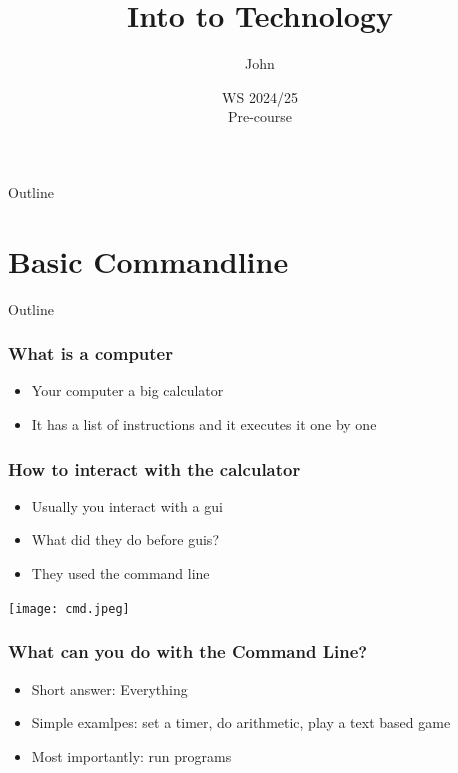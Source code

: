 \documentclass[aspectratio=169,hyperref={unicode}]{beamer}
\title{Into to Technology}
\author{John}
\institute{Fachschaft General \& Computational Linguistics\\ \textbf{University of Tübingen}}
\date{WS 2024/25 \\ Pre-course}
\begin{document}
\begin{frame}
\titlepage
\end{frame}



\begin{frame}{Outline}
\tableofcontents[currentsection]
\end{frame}


\section{Basic Commandline}

\begin{frame}{Outline}
\tableofcontents[currentsection]
\end{frame}



\begin{frame}
\frametitle{What is a computer}

\begin{itemize}
\item Your computer a big calculator
        \item It has a list of instructions and it executes it one by one
\end{itemize}
\end{frame}

\begin{frame}
\frametitle{How to interact with the calculator}

\begin{itemize}
\item Usually you interact with a gui
        \item What did they do before guis?
\item They used the command line
\end{itemize}
\texttt{[image: cmd.jpeg]}
\end{frame}
%

\begin{frame}[fragile]
\frametitle{What can you do with the Command Line?}
\begin{itemize}
        \item Short answer: Everything
        \item Simple examlpes: set a timer, do arithmetic, play a text based game
        \item Most importantly: run programs
\end{itemize}
\end{frame}
\end{document}
